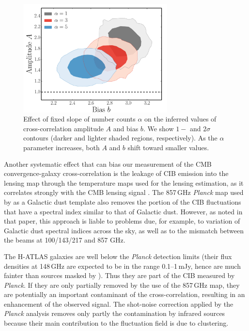 \begin{figure} %
\centering %
\includegraphics[width=0.7\textwidth]{Chapter3/Images/f18}
\caption{Effect of fixed slope of number counts $\alpha$ on the inferred values of cross-correlation amplitude $A$ and bias $b$. We show $1-$ and $2\sigma$ contours (darker and lighter shaded regions, respectively). As the $\alpha$ parameter increases, both $A$ and $b$ shift toward smaller values. \label{fig:kg_gg_alphas_pdf}}
\end{figure}

Another systematic effect that can bias our measurement of the \gls{CMB} convergence-galaxy cross-correlation is the leakage of \gls{CIB} emission into the lensing map through the temperature maps used for the lensing estimation, as it correlates strongly with the \gls{CMB} lensing signal \cite{Ade2014a}. The 857\,GHz \emph{Planck} map used by \cite{Ade2014c} as a Galactic dust template also removes the portion of the CIB fluctuations that have a spectral index similar to that of Galactic dust. However, as noted in that paper, this approach is liable to problems due, for example, to variation of Galactic dust spectral indices across the sky, as well as to the mismatch between the beams at 100/143/217 and 857 GHz.

The H-ATLAS galaxies are well below the \emph{Planck} detection limits (their flux densities at 148\,GHz are expected to be in the range 0.1--1\,mJy, hence are much fainter than sources masked by \cite{Ade2014c}). Thus they are part of the CIB measured by \emph{Planck}. If they are only partially removed by the use of the 857\,GHz map, they are potentially an important contaminant of the cross-correlation, resulting in an enhancement of the observed signal. The shot-noise correction applied by the \emph{Planck} analysis removes only partly the contamination by infrared sources because their main contribution to the fluctuation field is due to clustering.

